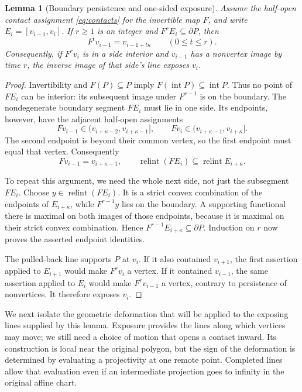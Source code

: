 \documentclass[11pt,a4paper]{article}
\DeclareMathOperator{\relint}{relint}
\newtheorem{lemma}[theorem]{Lemma}
\theoremstyle{definition}
\theoremstyle{remark}
\numberwithin{equation}{section}
\begin{document}
\begin{lemma}[Boundary persistence and one-sided exposure]
\label{lem:boundary-persistence}
Assume the half-open contact assignment \eqref{eq:contacts} for the
invertible map $F$, and write $E_i=[v_{i-1},v_i]$.
If $r\ge1$ is an integer and $F^rE_i\subseteq\partial P$, then
\[
 F^t v_{i-1}=v_{i-1+t\kappa}\qquad(0\le t\le r).
\]
Consequently, if $F^rv_i$ is in a side interior and $v_{i-1}$ has a
nonvertex image by time $r$, the inverse image of that side's line
exposes $v_i$.
\end{lemma}
\begin{proof}
Invertibility and $F(P)\subseteq P$ imply
$F(\operatorname{int}P)\subseteq\operatorname{int}P$.  Thus no point of
$FE_i$ can be interior: its subsequent image under $F^{r-1}$ is on the
boundary.  The nondegenerate boundary segment $FE_i$ must lie in one
side.  Its endpoints, however, have the adjacent half-open assignments
\[
 Fv_{i-1}\in(v_{i+\kappa-2},v_{i+\kappa-1}],\qquad
 Fv_i\in(v_{i+\kappa-1},v_{i+\kappa}].
\]
The second endpoint is beyond their common vertex, so the first endpoint
must equal that vertex.  Consequently
\[
 Fv_{i-1}=v_{i+\kappa-1},\qquad
 \relint(FE_i)\subseteq\relint E_{i+\kappa}.
\]

To repeat this argument, we need the whole next side, not just the
subsegment $FE_i$.  Choose $y\in\relint(FE_i)$.  It is a strict convex
combination of the endpoints of $E_{i+\kappa}$, while $F^{r-1}y$ lies
on the boundary.  A supporting functional there is maximal on both
images of those endpoints, because it is maximal on their strict convex
combination.  Hence $F^{r-1}E_{i+\kappa}\subseteq\partial P$.
Induction on $r$ now proves the asserted endpoint identities.

The pulled-back line supports $P$ at $v_i$.  If it also contained
$v_{i+1}$, the first assertion applied to $E_{i+1}$ would make
$F^rv_i$ a vertex.  If it contained $v_{i-1}$, the same assertion
applied to $E_i$ would make $F^rv_{i-1}$ a vertex, contrary to
persistence of nonvertices.  It therefore exposes $v_i$.
\end{proof}

We next isolate the geometric deformation that will be applied to the
exposing lines supplied by this lemma.  Exposure provides the lines along
which vertices may move; we still need a choice of motion that opens a
contact inward.  Its construction is local near
the original polygon, but the sign of the deformation is determined by
evaluating a projectivity at one remote point.  Completed lines allow
that evaluation even if an intermediate projection goes to infinity in
the original affine chart.
\end{document}
